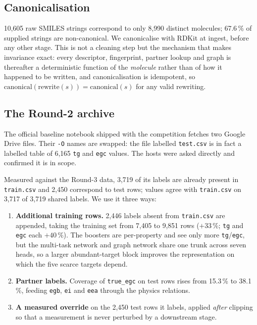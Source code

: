 \documentclass[11pt,a4paper]{article}
\newcommand{\prop}[1]{\texttt{#1}}
\begin{document}
\subsection{Canonicalisation}

10{,}605 raw SMILES strings correspond to only 8{,}990 distinct molecules;
67.6\,\% of supplied strings are non-canonical. We canonicalise with RDKit at
ingest, before any other stage. This is not a cleaning step but the mechanism
that makes invariance exact: every descriptor, fingerprint, partner lookup and
graph is thereafter a deterministic function of the \emph{molecule} rather than
of how it happened to be written, and canonicalisation is idempotent, so
$\text{canonical}(\text{rewrite}(s)) = \text{canonical}(s)$ for any valid
rewriting.

\subsection{The Round-2 archive}

The official baseline notebook shipped with the competition fetches two Google
Drive files. Their \texttt{-O} names are swapped: the file labelled
\texttt{test.csv} is in fact a labelled table of 6{,}165 \prop{tg} and
\prop{egc} values. The hosts were asked directly and confirmed it is in scope.

Measured against the Round-3 data, 3{,}719 of its labels are already present in
\texttt{train.csv} and 2{,}450 correspond to test rows; values agree with
\texttt{train.csv} on 3{,}717 of 3{,}719 shared labels. We use it three ways:

\begin{enumerate}[leftmargin=1.6em,itemsep=0.15em]
  \item \textbf{Additional training rows.} 2{,}446 labels absent from
    \texttt{train.csv} are appended, taking the training set from 7{,}405 to
    9{,}851 rows ($+33\,\%$; \prop{tg} and \prop{egc} each $+40\,\%$). The
    boosters are per-property and see only more \prop{tg}/\prop{egc}, but the
    multi-task network and graph network share one trunk across seven heads, so
    a larger abundant-target block improves the representation on which the five
    scarce targets depend.
  \item \textbf{Partner labels.} Coverage of \texttt{true\_egc} on test rows
    rises from 15.3\,\% to 38.1\,\%, feeding \prop{egb}, \prop{ei} and \prop{eea}
    through the physics relations.
  \item \textbf{A measured override} on the 2{,}450 test rows it labels, applied
    \emph{after} clipping so that a measurement is never perturbed by a
    downstream stage.
\end{enumerate}
\end{document}

